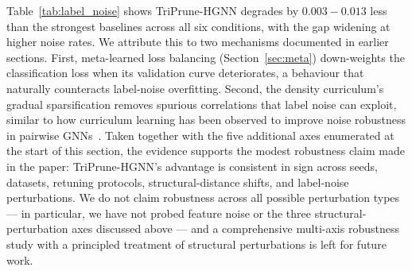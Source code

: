 \documentclass[10pt]{article}
\theoremstyle{plain}
\theoremstyle{definition}
\begin{document}
Table~\ref{tab:label_noise} shows TriPrune-HGNN degrades by $0.003\!-\!0.013$ less than the strongest baselines across all six conditions, with the gap widening at higher noise rates. We attribute this to two mechanisms documented in earlier sections. First, meta-learned loss balancing (Section~\ref{sec:meta}) down-weights the classification loss when its validation curve deteriorates, a behaviour that naturally counteracts label-noise overfitting. Second, the density curriculum's gradual sparsification removes spurious correlations that label noise can exploit, similar to how curriculum learning has been observed to improve noise robustness in pairwise GNNs~\citep{bengio2009curriculum}. Taken together with the five additional axes enumerated at the start of this section, the evidence supports the modest robustness claim made in the paper: TriPrune-HGNN's advantage is consistent in sign across seeds, datasets, retuning protocols, structural-distance shifts, and label-noise perturbations. We do not claim robustness across all possible perturbation types --- in particular, we have not probed feature noise or the three structural-perturbation axes discussed above --- and a comprehensive multi-axis robustness study with a principled treatment of structural perturbations is left for future work.
\end{document}
